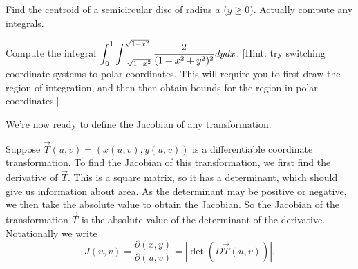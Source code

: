 \begin{problem}
Find the centroid of a semicircular disc of radius $a$ ($y\geq 0$). Actually compute any integrals.  


\end{problem}

\begin{problem}
Compute the integral $\displaystyle \int_{0}^{1}\int_{-\sqrt{1-x^2}}^{\sqrt{1-x^2}} \frac{2}{(1+x^2+y^2)^2}dydx$. [Hint: try switching coordinate systems to polar coordinates.  This will require you to first draw the region of integration, and then then obtain bounds for the region in polar coordinates.]
\end{problem}




We're now ready to define the Jacobian of any transformation.
\begin{definition}
 Suppose $\vec T(u,v)=(x(u,v),y(u,v))$ is a differentiable coordinate transformation. To find the Jacobian of this transformation, we first find the derivative of $\vec T$.  This is a square matrix, so it has a determinant, which should give us information about area. As the determinant may be positive or negative, we then take the absolute value to obtain the Jacobian.  So the Jacobian of the transformation $\vec T$ is the absolute value of the determinant of the derivative. 
 Notationally we write 
$$J(u,v) = \frac{\partial (x,y)}{\partial (u,v)} = |\det(D\vec T(u,v))|.$$
\end{definition}


